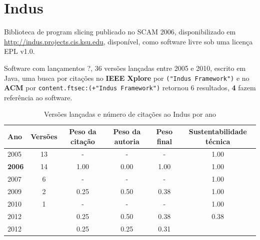 \section{Indus}

Biblioteca de program slicing
publicado no SCAM 2006,
disponibilizado em \url{http://indus.projects.cis.ksu.edu},
disponível,
como software livre
sob uma licença EPL v1.0.

Software com lançamentos ?,
36 versões lançadas
entre 2005 e 2010,
escrito em Java,
uma busca por citações no {\bf IEEE Xplore} por
\texttt{("Indus Framework")}
e no {\bf ACM} por
\texttt{content.ftsec:(+"Indus Framework")}
retornou
6 resultados,
{\bf 4} fazem referência ao software.


\begin{table}[H]
\caption{Versões lançadas e número de citações ao Indus por ano}
\centering
\begin{tabular}{| l | c | c | c | c | c |}
  \hline
  Ano & Versões & Peso da citação & Peso da autoria & Peso final & Sustentabilidade técnica \\
  \hline
        2005 & 13 & - & - & -
        &
          {\color{blue} 1.00}
        \\
\hline
            {\bf 2006}
          &
          14
          &
          1.00
          &
          0.00
          &
          1.00
          &
            {\color{blue} 1.00}
          \\
\hline
        2007 & 6 & - & - & -
        &
          {\color{blue} 1.00}
        \\
\hline
            2009
          &
          2
          &
          0.25
          &
          0.50
          &
          0.38
          &
            {\color{blue} 1.00}
          \\
\hline
        2010 & 1 & - & - & -
        &
          {\color{blue} 1.00}
        \\
\hline
            2012
          &
          
          &
          0.25
          &
          0.50
          &
          0.38
          &
            {\color{red} 0.38}
          \\
            2012
          &
          
          &
          0.25
          &
          0.25
          &
          0.31
          &
          \\
\hline
\end{tabular}
\end{table}

